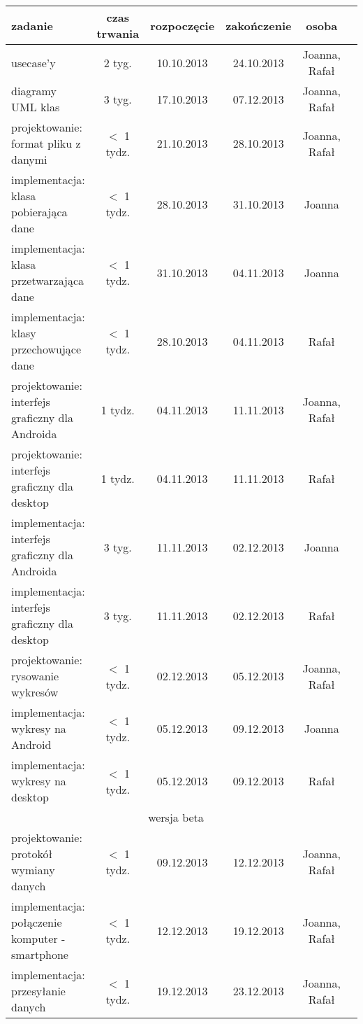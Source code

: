 \begin{center}
\label{harmonogram}
    \begin{tabular}{|p{5cm}|c|c|c|c|c|}
    \hline
        \textbf{zadanie} & \textbf{czas trwania} & \textbf{rozpoczęcie} & \textbf{zakończenie} & \textbf{osoba}\\
    \hline
        usecase'y & 2 tyg. & 10.10.2013 & 24.10.2013 & Joanna, Rafał\\
        diagramy UML klas & 3 tyg. & 17.10.2013 & 07.12.2013 & Joanna, Rafał\\
    \hline
        projektowanie: format pliku z danymi & $<$ 1 tydz. & 21.10.2013 & 28.10.2013 & Joanna, Rafał\\
        implementacja: klasa pobierająca dane & $<$ 1 tydz. & 28.10.2013 & 31.10.2013 & Joanna\\
        implementacja: klasa przetwarzająca dane & $<$ 1 tydz. & 31.10.2013 & 04.11.2013 & Joanna\\
        implementacja: klasy przechowujące dane & $<$ 1 tydz. & 28.10.2013 & 04.11.2013 & Rafał\\
    \hline
        projektowanie: interfejs graficzny dla Androida & 1 tydz. & 04.11.2013 & 11.11.2013 & Joanna, Rafał\\
        projektowanie: interfejs graficzny dla desktop & 1 tydz. & 04.11.2013 & 11.11.2013 & Rafał\\
        implementacja: interfejs graficzny dla Androida & 3 tyg. & 11.11.2013 & 02.12.2013 & Joanna\\
        implementacja: interfejs graficzny dla desktop & 3 tyg. & 11.11.2013 & 02.12.2013 & Rafał\\
    \hline
        projektowanie: rysowanie wykresów & $<$ 1 tydz. & 02.12.2013 & 05.12.2013 & Joanna, Rafał\\
        implementacja: wykresy na Android & $<$ 1 tydz. & 05.12.2013 & 09.12.2013 & Joanna\\
        implementacja: wykresy na desktop & $<$ 1 tydz. & 05.12.2013 & 09.12.2013 & Rafał\\
    \hline
        \multicolumn{5}{|c|}{wersja beta}\\
    \hline
        projektowanie: protokół wymiany danych & $<$ 1 tydz. & 09.12.2013 & 12.12.2013 & Joanna, Rafał\\
        implementacja: połączenie komputer - smartphone & $<$ 1 tydz. & 12.12.2013 & 19.12.2013 & Joanna, Rafał\\
        implementacja: przesyłanie danych & $<$ 1 tydz. & 19.12.2013 & 23.12.2013 & Joanna, Rafał\\
    \hline
    \end{tabular}
\end{center}

